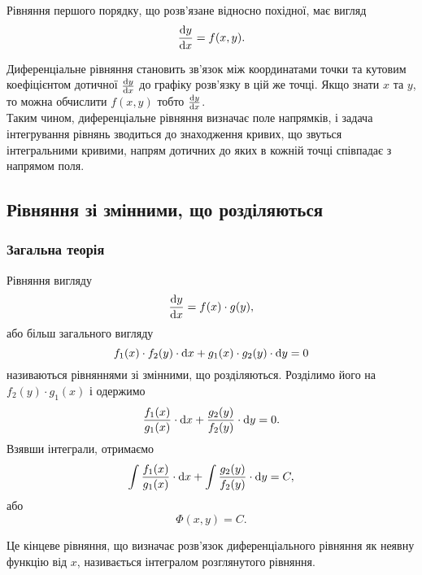 Рівняння першого порядку, що розв’язане відносно похідної, має вигляд
\begin{equation*}
	\frac{\mathop{}\!\mathrm{d} y}{\mathop{}\!\mathrm{d} x} = f(x, y).	
\end{equation*}

Диференціальне рівняння становить зв’язок між координатами точки та кутовим коефіцієнтом дотичної $\frac{\mathop{}\!\mathrm{d} y}{\mathop{}\!\mathrm{d} x}$ до графіку розв’язку в цій же точці. Якщо знати $x$ та $y$, то можна обчислити $f(x, y)$ тобто $\frac{\mathop{}\!\mathrm{d} y}{\mathop{}\!\mathrm{d} x}$. \\

Таким чином, диференціальне рівняння визначає поле напрямків, і задача інтегрування рівнянь зводиться до знаходження кривих, що звуться інтегральними кривими, напрям дотичних до яких в кожній точці співпадає з напрямом поля.

\subsection{Рівняння зі змінними, що розділяються}

\subsubsection{Загальна теорія}

Рівняння вигляду
\begin{equation*}
	\frac{\mathop{}\!\mathrm{d} y}{\mathop{}\!\mathrm{d} x} = f(x) \cdot g(y),
\end{equation*}
або більш загального вигляду
\begin{equation*}
	f_1(x) \cdot f_2(y) \cdot \mathop{}\!\mathrm{d} x + g_1(x) \cdot g_2(y) \cdot \mathop{}\!\mathrm{d} y = 0
\end{equation*}
називаються рівняннями зі змінними, що розділяються. Розділимо його на $f_2(y) \cdot g_1(x)$ і одержимо
\begin{equation*}
    \label{eq:separated-equation}
	\frac{f_1(x)}{g_1(x)} \cdot \mathop{}\!\mathrm{d} x + \frac{g_2(y)}{f_2(y)} \cdot \mathop{}\!\mathrm{d} y = 0.
\end{equation*}
Взявши інтеграли, отримаємо
\begin{equation*}
	\int \frac{f_1(x)}{g_1(x)} \cdot \mathop{}\!\mathrm{d} x + \int \frac{g_2(y)}{f_2(y)} \cdot \mathop{}\!\mathrm{d} y = C,
\end{equation*}
або 
\begin{equation*}
	\Phi(x, y) = C.
\end{equation*}

\begin{definition}
	Це кінцеве рівняння, що визначає розв’язок диференціального рівняння як неявну функцію від $x$, називається інтегралом розглянутого рівняння.
\end{definition}

